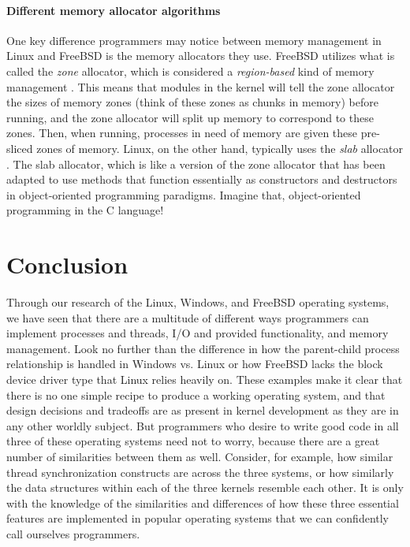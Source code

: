 \documentclass[letterpaper,10pt,titlepage]{article}
\begin{document}
\paragraph{Different memory allocator algorithms}
One key difference programmers may notice between memory management in Linux and FreeBSD is the memory allocators they use. FreeBSD utilizes what is called the \emph{zone} allocator, which is considered a \emph{region-based} kind of memory management \cite{freeBSD3}. This means that modules in the kernel will tell the zone allocator the sizes of memory zones (think of these zones as chunks in memory) before running, and the zone allocator will split up memory to correspond to these zones. Then, when running, processes in need of memory are given these pre-sliced zones of memory. Linux, on the other hand, typically uses the \emph{slab} allocator \cite{linux2}. The slab allocator, which is like a version of the zone allocator that has been adapted to use methods that function essentially as constructors and destructors in object-oriented programming paradigms. Imagine that, object-oriented programming in the C language! 

\section{Conclusion}
Through our research of the Linux, Windows, and FreeBSD operating systems, we have seen that there are a multitude of different ways programmers can implement processes and threads, I/O and provided functionality, and memory management. Look no further than the difference in how the parent-child process relationship is handled in Windows vs. Linux or how FreeBSD lacks the block device driver type that Linux relies heavily on. These examples make it clear that there is no one simple recipe to produce a working operating system, and that design decisions and tradeoffs are as present in kernel development as they are in any other worldly subject. But programmers who desire to write good code in all three of these operating systems need not to worry, because there are a great number of similarities between them as well. Consider, for example, how similar thread synchronization constructs are across the three systems, or how similarly the data structures within each of the three kernels resemble each other. It is only with the knowledge of the similarities and differences of how these three essential features are implemented in popular operating systems that we can confidently call ourselves programmers.


\newpage
{}

\end{document}
